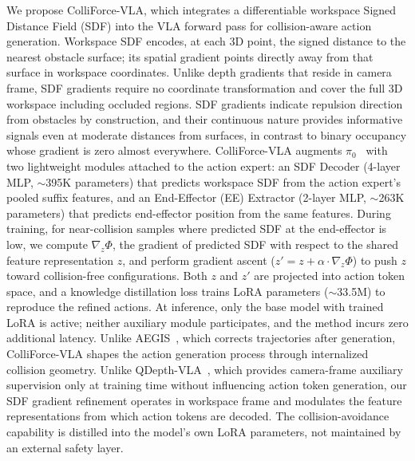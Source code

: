 We propose ColliForce-VLA, which integrates a differentiable workspace Signed Distance Field (SDF) into the VLA forward pass for collision-aware action generation. Workspace SDF encodes, at each 3D point, the signed distance to the nearest obstacle surface; its spatial gradient points directly away from that surface in workspace coordinates. Unlike depth gradients that reside in camera frame, SDF gradients require no coordinate transformation and cover the full 3D workspace including occluded regions. SDF gradients indicate repulsion direction from obstacles by construction, and their continuous nature provides informative signals even at moderate distances from surfaces, in contrast to binary occupancy whose gradient is zero almost everywhere. ColliForce-VLA augments $\pi_0$~\cite{black2024pi0} with two lightweight modules attached to the action expert: an SDF Decoder (4-layer MLP, ${\sim}$395K parameters) that predicts workspace SDF from the action expert's pooled suffix features, and an End-Effector (EE) Extractor (2-layer MLP, ${\sim}$263K parameters) that predicts end-effector position from the same features. During training, for near-collision samples where predicted SDF at the end-effector is low, we compute $\nabla_z \Phi$, the gradient of predicted SDF with respect to the shared feature representation $z$, and perform gradient ascent ($z' = z + \alpha \cdot \nabla_z \Phi$) to push $z$ toward collision-free configurations. Both $z$ and $z'$ are projected into action token space, and a knowledge distillation loss trains LoRA parameters (${\sim}$33.5M) to reproduce the refined actions. At inference, only the base model with trained LoRA is active; neither auxiliary module participates, and the method incurs zero additional latency. Unlike AEGIS~\cite{hu2025vlsa}, which corrects trajectories after generation, ColliForce-VLA shapes the action generation process through internalized collision geometry. Unlike QDepth-VLA~\cite{li2025qdepth}, which provides camera-frame auxiliary supervision only at training time without influencing action token generation, our SDF gradient refinement operates in workspace frame and modulates the feature representations from which action tokens are decoded. The collision-avoidance capability is distilled into the model's own LoRA parameters, not maintained by an external safety layer.

